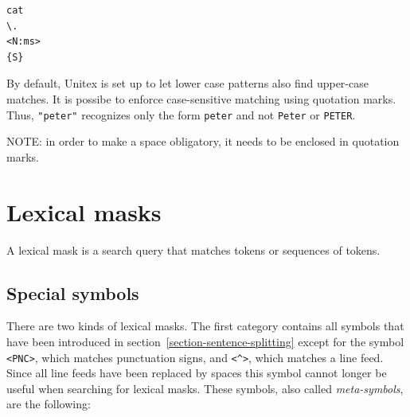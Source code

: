 \begin{verbatim}
cat
\.
<N:ms>
{S}
\end{verbatim}

\noindent By default, Unitex is set up to let lower case patterns also find
upper-case matches. It is possibe to enforce case-sensitive matching using quotation marks. Thus,
\verb+"peter"+ recognizes only the form \verb+peter+ and not \verb+Peter+
or \verb+PETER+.

\bigskip
\noindent NOTE: in order to make a space obligatory, it needs to  be  enclosed 
in quotation marks.


\section{Lexical masks}
A lexical mask is a search query that matches tokens or sequences of tokens.

\subsection{Special symbols}
\label{section-special-symbols}

There are two kinds of lexical masks. The first category contains all symbols that have
been introduced in section~\ref{section-sentence-splitting} except for the
symbol \verb$<PNC>$, which matches punctuation signs, and \verb+<^>+, which matches a line feed.
Since all line feeds have been replaced by spaces this symbol cannot longer be
useful when searching for lexical masks. These symbols, also called \textit{meta-symbols}, are
the following:

